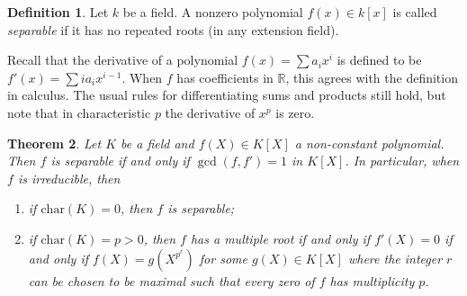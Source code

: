 \documentclass[12pt]{report}
\newtheorem{thm}{Theorem}[section]
\theoremstyle{definition}
\newtheorem{defn}[thm]{Definition}
\def\RR{\mathbb{R}}
\def\char{\text{char}}
\begin{document}
\begin{defn}
    Let $k$ be a field. A nonzero polynomial $f(x) \in k[x]$ is called \emph{separable} if it has no repeated roots (in any extension field). 
\end{defn}

Recall that the derivative of a polynomial $f(x)=\sum a_i x^i$ is defined to be $f'(x) = \sum ia_ix^{i-1}$. When $f$ has coefficients in $\RR$, this agrees with the definition in calculus. The usual rules for differentiating sums and products still hold, but note that in characteristic $p$ the derivative of $x^p$ is zero.

\begin{thm}\label{sep}
    Let $K$ be a field and $f(X)\in K[X]$ a non-constant polynomial. Then $f$ is separable if and only if $\gcd(f,f')=1$ in $K[X]$. In particular, when $f$ is irreducible, then
    \begin{enumerate}
        \item  if $\char(K)=0$, then $f$ is separable;
        \item  if $\char(K)=p>0$, then $f$ has a multiple root if and only if $f'(X)=0$ if and only if $f(X)=g(X^{p^r})$ for some $g(X)\in K[X]$ where the integer $r$ can be chosen to be maximal such that every zero of $f$ has multiplicity $p$.
    \end{enumerate}
\end{thm}
\end{document}
